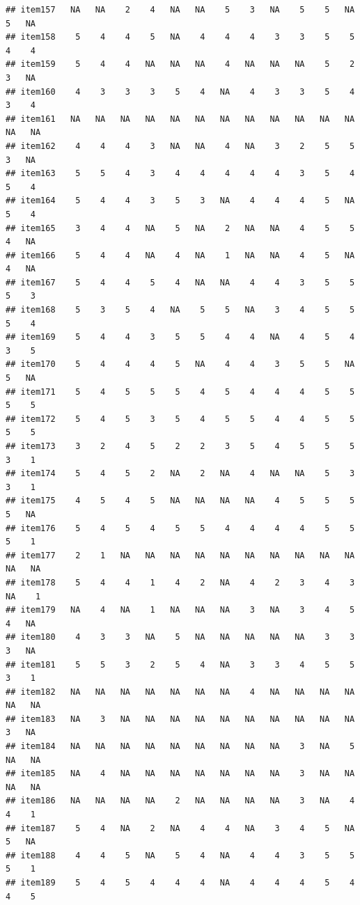\documentclass[
  man]{apa6}
\begin{document}
\begin{verbatim}
## item157   NA   NA    2    4   NA   NA    5    3   NA    5    5   NA    5   NA
## item158    5    4    4    5   NA    4    4    4    3    3    5    5    4    4
## item159    5    4    4   NA   NA   NA    4   NA   NA   NA    5    2    3   NA
## item160    4    3    3    3    5    4   NA    4    3    3    5    4    3    4
## item161   NA   NA   NA   NA   NA   NA   NA   NA   NA   NA   NA   NA   NA   NA
## item162    4    4    4    3   NA   NA    4   NA    3    2    5    5    3   NA
## item163    5    5    4    3    4    4    4    4    4    3    5    4    5    4
## item164    5    4    4    3    5    3   NA    4    4    4    5   NA    5    4
## item165    3    4    4   NA    5   NA    2   NA   NA    4    5    5    4   NA
## item166    5    4    4   NA    4   NA    1   NA   NA    4    5   NA    4   NA
## item167    5    4    4    5    4   NA   NA    4    4    3    5    5    5    3
## item168    5    3    5    4   NA    5    5   NA    3    4    5    5    5    4
## item169    5    4    4    3    5    5    4    4   NA    4    5    4    3    5
## item170    5    4    4    4    5   NA    4    4    3    5    5   NA    5   NA
## item171    5    4    5    5    5    4    5    4    4    4    5    5    5    5
## item172    5    4    5    3    5    4    5    5    4    4    5    5    5    5
## item173    3    2    4    5    2    2    3    5    4    5    5    5    3    1
## item174    5    4    5    2   NA    2   NA    4   NA   NA    5    3    3    1
## item175    4    5    4    5   NA   NA   NA   NA    4    5    5    5    5   NA
## item176    5    4    5    4    5    5    4    4    4    4    5    5    5    1
## item177    2    1   NA   NA   NA   NA   NA   NA   NA   NA   NA   NA   NA   NA
## item178    5    4    4    1    4    2   NA    4    2    3    4    3   NA    1
## item179   NA    4   NA    1   NA   NA   NA    3   NA    3    4    5    4   NA
## item180    4    3    3   NA    5   NA   NA   NA   NA   NA    3    3    3   NA
## item181    5    5    3    2    5    4   NA    3    3    4    5    5    3    1
## item182   NA   NA   NA   NA   NA   NA   NA    4   NA   NA   NA   NA   NA   NA
## item183   NA    3   NA   NA   NA   NA   NA   NA   NA   NA   NA   NA    3   NA
## item184   NA   NA   NA   NA   NA   NA   NA   NA   NA    3   NA    5   NA   NA
## item185   NA    4   NA   NA   NA   NA   NA   NA   NA    3   NA   NA   NA   NA
## item186   NA   NA   NA   NA    2   NA   NA   NA   NA    3   NA    4    4    1
## item187    5    4   NA    2   NA    4    4   NA    3    4    5   NA    5   NA
## item188    4    4    5   NA    5    4   NA    4    4    3    5    5    5    1
## item189    5    4    5    4    4    4   NA    4    4    4    5    4    4    5

\end{verbatim}
\end{document}

